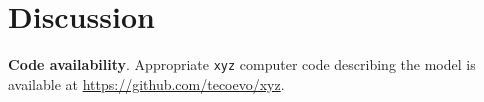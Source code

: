 \documentclass{article}
\begin{document}
\section{Discussion}



\textbf{Code availability}.
Appropriate {\tt{xyz}} computer code describing the model is available at {\url{https://github.com/tecoevo/xyz}}.





\end{document}
